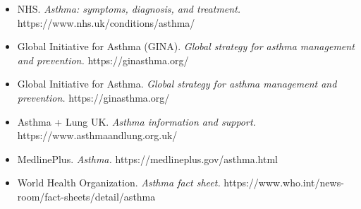 \begin{itemize}
    \item NHS. \textit{Asthma: symptoms, diagnosis, and treatment.} https://www.nhs.uk/conditions/asthma/
    \item Global Initiative for Asthma (GINA). \textit{Global strategy for asthma management and prevention.} https://ginasthma.org/
    \item Global Initiative for Asthma. \textit{Global strategy for asthma management and prevention.} https://ginasthma.org/
    \item Asthma + Lung UK. \textit{Asthma information and support.} https://www.asthmaandlung.org.uk/
    \item MedlinePlus. \textit{Asthma.} https://medlineplus.gov/asthma.html
    \item World Health Organization. \textit{Asthma fact sheet.} https://www.who.int/news-room/fact-sheets/detail/asthma
\end{itemize}
